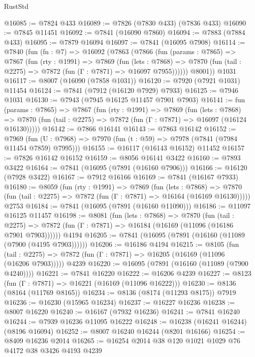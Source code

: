 \begin{lexlean}{RustStd}
\begin{coremodule}
@16085 := @7824 @433
@16089 := @7826 (@7830 @433) (@7836 @433)
@16090 := @7845 @11451
@16092 := @7841 (@16090 @7860)
@16094 := @7883 (@7884 @433)
@16095 := @7879 @16094
@16097 := @7841 (@16095 @7908)
@16114 := @7840
    (fun (fn : @7) =>
    @16092
      (@7863
        (@7866
          (fun (params : @7865) =>
          @7867
            (fun (rty : @1991) =>
            @7869
              (fun (lets : @7868) =>
              @7870 (fun (tail : @2275) => @7872 (fun (Γ : @7871) => @16097 @7955))))))
        @8001))
    @1031
@16117 := @8007 (@16090 (@7858 @1031))
@16120 := @7920 (@7921 @1031) @11454
@16124 := @7841 (@7912 (@16120 @7929) @7933)
@16125 := @7946 @1031
@16130 := @7943 (@7945 @16125 @11457 @7901 @7903)
@16141 := fun (params : @7865) =>
  @7867
    (fun (rty : @1991) =>
    @7869
      (fun (lets : @7868) =>
      @7870 (fun (tail : @2275) => @7872 (fun (Γ : @7871) => @16097 (@16124 @16130)))))
@16142 := @7866 @16141
@16143 := @7863 @16142
@16152 := @7969
    (fun (U : @7968) => @7970 (fun (t : @59) => @7978 (@7841 (@7984 @11454 @7859) @7995)))
@16155 := @16117 (@16143 @16152) @11452
@16157 := @7826 @16142 @16152
@16159 := @8056 @16141 @3422
@16160 := @7893 @3422
@16164 := @7841 (@16095 (@7891 (@16160 @7906)))
@16166 := @16120 (@7928 @3422)
@16167 := @7912 @16166
@16169 := @7841 (@16167 @7933)
@16180 := @8059
    (fun (rty : @1991) =>
    @7869
      (fun (lets : @7868) =>
      @7870 (fun (tail : @2275) => @7872 (fun (Γ : @7871) => @16164 (@16169 @16130)))))
    @2753
@16184 := @7841 (@16095 (@7891 (@16160 @11090)))
@16186 := @11097 @16125 @11457
@16198 := @8081
    (fun (lets : @7868) =>
    @7870
      (fun (tail : @2275) =>
      @7872 (fun (Γ : @7871) => @16184 (@16169 (@11096 (@16186 @7901 @7903))))))
    @4194
@16205 := @7841 (@16095 (@7891 (@16160 (@11089 (@7900 (@4195 @7903))))))
@16206 := @16186 @4194
@16215 := @8105
    (fun (tail : @2275) => @7872 (fun (Γ : @7871) => @16205 (@16169 (@11096 (@16206 @7903)))))
    @4239
@16220 := @16095 (@7891 (@16160 (@11089 (@7900 @4240))))
@16221 := @7841 @16220
@16222 := @16206 @4239
@16227 := @8123 (fun (Γ : @7871) => @16221 (@16169 (@11096 @16222)))
@16230 := @8136 (@8164 (@11769 @8165))
@16234 := @8136 (@8174 (@11293 @8175)) @7919
@16236 := @16230 (@15965 @16234)
@16237 := @16227 @16236
@16238 := @8007 @16220
@16240 := @16167 (@7932 @16236)
@16241 := @7841 @16240
@16244 := @7939 @16236 @11095 @16222
@16248 := @16238 (@16241 @16244) (@8196 @16094)
@16252 := @8007 @16240 @16244 (@8201 @16166)
@16254 := @8409 @16236 @2014
@16265 := @16254 @2014 @38 @120 @1021 @1029 @76 @4172 @38 @3426 @4193 @4239

\end{coremodule}
\end{lexlean}
